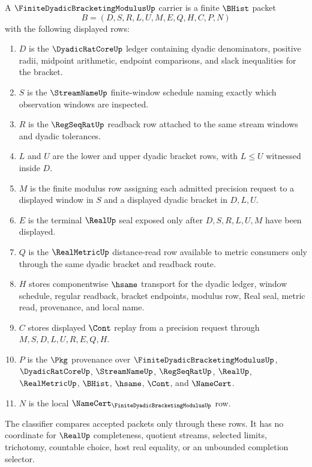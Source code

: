 \begin{definition}
\label{def:finite-dyadic-bracketing-modulus-carrier}
A $\FiniteDyadicBracketingModulusUp$ carrier is a finite $\BHist$ packet
$$
B=(D,S,R,L,U,M,E,Q,H,C,P,N)
$$
with the following displayed rows:
\begin{enumerate}
\item $D$ is the $\DyadicRatCoreUp$ ledger containing dyadic denominators, positive radii, midpoint arithmetic, endpoint comparisons, and slack inequalities for the bracket.
\item $S$ is the $\StreamNameUp$ finite-window schedule naming exactly which observation windows are inspected.
\item $R$ is the $\RegSeqRatUp$ readback row attached to the same stream windows and dyadic tolerances.
\item $L$ and $U$ are the lower and upper dyadic bracket rows, with $L \leq U$ witnessed inside $D$.
\item $M$ is the finite modulus row assigning each admitted precision request to a displayed window in $S$ and a displayed dyadic bracket in $D,L,U$.
\item $E$ is the terminal $\RealUp$ seal exposed only after $D,S,R,L,U,M$ have been displayed.
\item $Q$ is the $\RealMetricUp$ distance-read row available to metric consumers only through the same dyadic bracket and readback route.
\item $H$ stores componentwise $\hsame$ transport for the dyadic ledger, window schedule, regular readback, bracket endpoints, modulus row, Real seal, metric read, provenance, and local name.
\item $C$ stores displayed $\Cont$ replay from a precision request through $M,S,D,L,U,R,E,Q,H$.
\item $P$ is the $\Pkg$ provenance over $\FiniteDyadicBracketingModulusUp$, $\DyadicRatCoreUp$, $\StreamNameUp$, $\RegSeqRatUp$, $\RealUp$, $\RealMetricUp$, $\BHist$, $\hsame$, $\Cont$, and $\NameCert$.
\item $N$ is the local $\NameCert_{\FiniteDyadicBracketingModulusUp}$ row.
\end{enumerate}
The classifier compares accepted packets only through these rows. It has no coordinate for $\RealUp$ completeness, quotient streams, selected limits, trichotomy, countable choice, host real equality, or an unbounded completion selector.
\end{definition}

